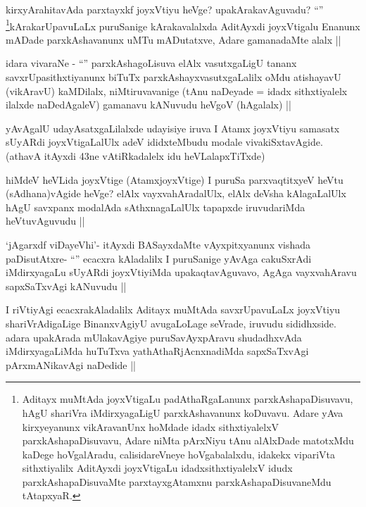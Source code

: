 \begin{artha}
kirxyArahitavAda parxtayxkf joyxVtiyu heVge? upakArakavAguvadu? ``\stext'' \footnote{Aditayx muMtAda joyxVtigaLu padAthaRgaLanunx parxkAshapaDisuvavu, hAgU shariVra iMdirxyagaLigU parxkAshavanunx koDuvavu. Adare yAva kirxyeyanunx vikAravanUnx hoMdade idadx sithxtiyalelxV parxkAshapaDisuvavu, Adare niMta pArxNiyu tAnu alAlxDade matotxMdu kaDege hoVgalAradu, calisidareVneye hoVgabalalxdu, idakekx vipariVta sithxtiyalilx  AditAyxdi joyxVtigaLu idadxsithxtiyalelxV idudx parxkAshapaDisuvaMte parxtayxgAtamxnu parxkAshapaDisuvaneMdu tAtapxyaR.}kArakarUpavuLaLx puruSanige kArakavalalxda AditAyxdi joyxVtigalu Enanunx mADade parxkAshavanunx uMTu mADutatxve, Adare gamanadaMte alalx ||
\end{artha}

\begin{artha}
idara vivaraNe - ``\stext'' parxkAshagoLisuva elAlx vasutxgaLigU tananx savxrUpasithxtiyanunx biTuTx parxkAshayxvasutxgaLalilx oMdu atishayavU (vikAravU) kaMDilalx, niMtiruvavanige (tAnu naDeyade = idadx sithxtiyalelx ilalxde naDedAgaleV) gamanavu kANuvudu heVgoV (hAgalalx) ||
\end{artha}

\begin{artha}
yAvAgalU udayAsatxgaLilalxde udayisiye iruva I Atamx joyxVtiyu samasatx sUyARdi joyxVtigaLalUlx adeV ididxteMbudu modale vivakiSxtavAgide. (athavA itAyxdi 43ne vAtiRkadalelx idu heVLalapxTiTxde)
\end{artha}

\begin{artha}
hiMdeV heVLida joyxVtige (AtamxjoyxVtige) I puruSa parxvaqtitxyeV heVtu (sAdhana)vAgide heVge? elAlx vayxvahAradalUlx, elAlx deVsha kAlagaLalUlx hAgU savxpanx modalAda sAthxnagaLalUlx tapapxde iruvudariMda heVtuvAguvudu ||
\end{artha}

\begin{artha}
`jAgarxdf viDayeVhi'- itAyxdi BASayxdaMte vAyxpitxyanunx vishada paDisutAtxre- ``\stext'' ecacxra kAladalilx I puruSanige yAvAga cakuSxrAdi iMdirxyagaLu sUyARdi joyxVtiyiMda upakaqtavAguvavo, AgAga vayxvahAravu sapxSaTxvAgi kANuvudu ||
\end{artha}

\begin{artha}
I riVtiyAgi ecacxrakAladalilx Aditayx muMtAda savxrUpavuLaLx joyxVtiyu shariVrAdigaLige BinanxvAgiyU avugaLoLage seVrade, iruvudu sididhxside. adara upakArada mUlakavAgiye puruSavAyxpAravu shudadhxvAda iMdirxyagaLiMda huTuTxva yathAthaRjAcnxnadiMda sapxSaTxvAgi pArxmANikavAgi naDedide ||
\end{artha}

